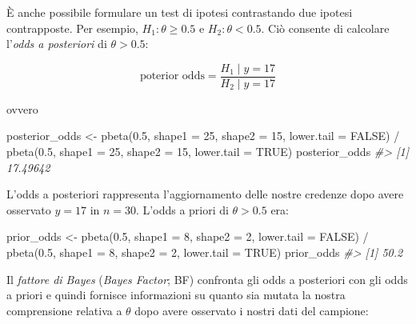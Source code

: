 \documentclass[
  11pt,
  italian,
  a4paper,
  extrafontsizes,onecolumn,openright
  ]{memoir}
\newenvironment{Shaded}{\begin{snugshade}}{\end{snugshade}}
\newcommand{\AttributeTok}[1]{\textcolor[rgb]{0.77,0.63,0.00}{#1}}
\newcommand{\CommentTok}[1]{\textcolor[rgb]{0.56,0.35,0.01}{\textit{#1}}}
\newcommand{\ConstantTok}[1]{\textcolor[rgb]{0.00,0.00,0.00}{#1}}
\newcommand{\DecValTok}[1]{\textcolor[rgb]{0.00,0.00,0.81}{#1}}
\newcommand{\FloatTok}[1]{\textcolor[rgb]{0.00,0.00,0.81}{#1}}
\newcommand{\FunctionTok}[1]{\textcolor[rgb]{0.00,0.00,0.00}{#1}}
\newcommand{\NormalTok}[1]{#1}
\newcommand{\OtherTok}[1]{\textcolor[rgb]{0.56,0.35,0.01}{#1}}
\newcommand{\SpecialCharTok}[1]{\textcolor[rgb]{0.00,0.00,0.00}{#1}}
\begin{document}
È anche possibile formulare un test di ipotesi contrastando due ipotesi contrapposte. Per esempio, \(H_1: \theta \geq 0.5\) e \(H_2: \theta < 0.5\). Ciò consente di calcolare l'\emph{odds a posteriori} di \(\theta > 0.5\):

\begin{equation}
\text{poterior odds} = \frac{H_1 \mid y = 17}{H_2 \mid y = 17}
\end{equation}

\noindent
ovvero

\begin{Shaded}
\begin{Highlighting}[]
\NormalTok{posterior\_odds }\OtherTok{\textless{}{-}}
  \FunctionTok{pbeta}\NormalTok{(}\FloatTok{0.5}\NormalTok{, }\AttributeTok{shape1 =} \DecValTok{25}\NormalTok{, }\AttributeTok{shape2 =} \DecValTok{15}\NormalTok{, }\AttributeTok{lower.tail =} \ConstantTok{FALSE}\NormalTok{) }\SpecialCharTok{/}
    \FunctionTok{pbeta}\NormalTok{(}\FloatTok{0.5}\NormalTok{, }\AttributeTok{shape1 =} \DecValTok{25}\NormalTok{, }\AttributeTok{shape2 =} \DecValTok{15}\NormalTok{, }\AttributeTok{lower.tail =} \ConstantTok{TRUE}\NormalTok{)}
\NormalTok{posterior\_odds}
\CommentTok{\#\textgreater{} [1] 17.49642}
\end{Highlighting}
\end{Shaded}

\noindent
L'odds a posteriori rappresenta l'aggiornamento delle nostre credenze dopo avere osservato \(y = 17\) in \(n = 30\). L'odds a priori di \(\theta > 0.5\) era:

\begin{Shaded}
\begin{Highlighting}[]
\NormalTok{prior\_odds }\OtherTok{\textless{}{-}}
  \FunctionTok{pbeta}\NormalTok{(}\FloatTok{0.5}\NormalTok{, }\AttributeTok{shape1 =} \DecValTok{8}\NormalTok{, }\AttributeTok{shape2 =} \DecValTok{2}\NormalTok{, }\AttributeTok{lower.tail =} \ConstantTok{FALSE}\NormalTok{) }\SpecialCharTok{/}
    \FunctionTok{pbeta}\NormalTok{(}\FloatTok{0.5}\NormalTok{, }\AttributeTok{shape1 =} \DecValTok{8}\NormalTok{, }\AttributeTok{shape2 =} \DecValTok{2}\NormalTok{, }\AttributeTok{lower.tail =} \ConstantTok{TRUE}\NormalTok{)}
\NormalTok{prior\_odds}
\CommentTok{\#\textgreater{} [1] 50.2}
\end{Highlighting}
\end{Shaded}

Il \emph{fattore di Bayes} (\emph{Bayes Factor}; BF) confronta gli odds a posteriori con gli odds a priori e quindi fornisce informazioni su quanto sia mutata la nostra comprensione relativa a \(\theta\) dopo avere osservato i nostri dati del campione:
\end{document}
